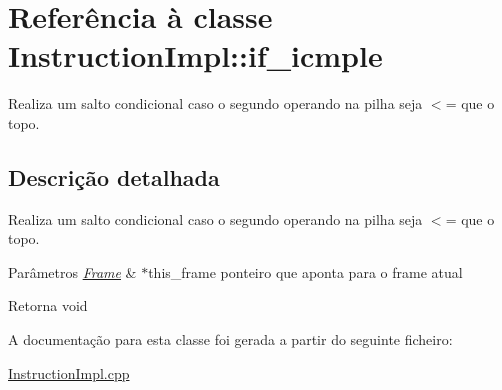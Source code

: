 \hypertarget{class_instruction_impl_1_1if__icmple}{}\section{Referência à classe Instruction\+Impl\+:\+:if\+\_\+icmple}
\label{class_instruction_impl_1_1if__icmple}


Realiza um salto condicional caso o segundo operando na pilha seja $<$= que o topo.  




\subsection{Descrição detalhada}
Realiza um salto condicional caso o segundo operando na pilha seja $<$= que o topo. 


\begin{DoxyParams}{Parâmetros}
{\em \hyperlink{struct_frame}{Frame}} & $\ast$this\+\_\+frame ponteiro que aponta para o frame atual \\
\hline
\end{DoxyParams}
\begin{DoxyReturn}{Retorna}
void 
\end{DoxyReturn}


A documentação para esta classe foi gerada a partir do seguinte ficheiro\+:\begin{DoxyCompactItemize}
\item 
\hyperlink{_instruction_impl_8cpp}{Instruction\+Impl.\+cpp}\end{DoxyCompactItemize}
